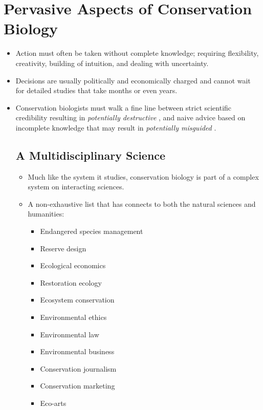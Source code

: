 \documentclass{inVerba-notes}
\begin{document}
\section{Pervasive Aspects of Conservation Biology}\label{Pervasive Aspects of Conservation Biology}
\begin{itemize}
    \item Action must often be taken without complete knowledge; requiring flexibility, creativity, building of intuition, and dealing with uncertainty.
    \item Decisions are usually politically and economically charged and cannot wait for detailed studies that take months or even years.
    \item Conservation biologists must walk a fine line between strict scientific credibility resulting in \emph{potentially destructive }, and naive advice based on incomplete knowledge that may result in \emph{potentially misguided }.
    
    \subsection{A Multidisciplinary Science}\label{A Multidisciplinary Science}
    \begin{itemize}
        \item Much like the system it studies, conservation biology is part of a complex system on interacting sciences.
        \item A non-exhaustive list that has connects to both the natural sciences and humanities:
        \begin{multicols}{2}
            \begin{itemize}
                \item Endangered species management
                \item Reserve design
                \item Ecological economics
                \item Restoration ecology
                \item Ecosystem conservation
                \item Environmental ethics
                \item Environmental law
                \item Environmental business
                \item Conservation journalism
                \item Conservation marketing
                \item Eco-arts
            \end{itemize}
        \end{multicols}
    \end{itemize}
    

\end{itemize}
\end{document}
